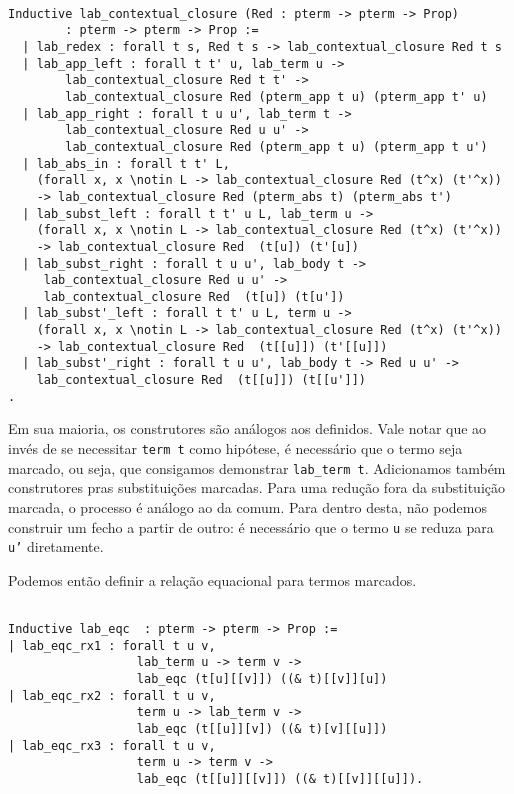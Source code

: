 \begin{lstlisting}[basicstyle=\small]

Inductive lab_contextual_closure (Red : pterm -> pterm -> Prop) 
        : pterm -> pterm -> Prop :=
  | lab_redex : forall t s, Red t s -> lab_contextual_closure Red t s
  | lab_app_left : forall t t' u, lab_term u -> 
        lab_contextual_closure Red t t' -> 
        lab_contextual_closure Red (pterm_app t u) (pterm_app t' u)
  | lab_app_right : forall t u u', lab_term t -> 
        lab_contextual_closure Red u u' -> 
        lab_contextual_closure Red (pterm_app t u) (pterm_app t u')
  | lab_abs_in : forall t t' L, 
    (forall x, x \notin L -> lab_contextual_closure Red (t^x) (t'^x)) 
    -> lab_contextual_closure Red (pterm_abs t) (pterm_abs t')
  | lab_subst_left : forall t t' u L, lab_term u -> 
    (forall x, x \notin L -> lab_contextual_closure Red (t^x) (t'^x)) 
    -> lab_contextual_closure Red  (t[u]) (t'[u])
  | lab_subst_right : forall t u u', lab_body t -> 
     lab_contextual_closure Red u u' -> 
	 lab_contextual_closure Red  (t[u]) (t[u']) 
  | lab_subst'_left : forall t t' u L, term u -> 
    (forall x, x \notin L -> lab_contextual_closure Red (t^x) (t'^x)) 
    -> lab_contextual_closure Red  (t[[u]]) (t'[[u]])
  | lab_subst'_right : forall t u u', lab_body t -> Red u u' -> 
    lab_contextual_closure Red  (t[[u]]) (t[[u']]) 
.
\end{lstlisting}

Em sua maioria, os construtores são análogos aos definidos. Vale notar que ao
invés de se necessitar \texttt{term t} como hipótese, é necessário que o termo
seja marcado, ou seja, que consigamos demonstrar \texttt{lab\_term t}.
Adicionamos também construtores pras substituições marcadas. 
Para uma redução fora da substituição marcada, o processo é análogo ao da comum.
Para dentro desta, não podemos construir um fecho a partir de outro: é
necessário que o termo \texttt{u} se reduza para \texttt{u'} diretamente.

Podemos então definir a relação equacional para termos marcados.

\begin{lstlisting}[basicstyle=\small]
    
Inductive lab_eqc  : pterm -> pterm -> Prop := 
| lab_eqc_rx1 : forall t u v, 
                  lab_term u -> term v -> 
                  lab_eqc (t[u][[v]]) ((& t)[[v]][u]) 
| lab_eqc_rx2 : forall t u v, 
                  term u -> lab_term v -> 
                  lab_eqc (t[[u]][v]) ((& t)[v][[u]]) 
| lab_eqc_rx3 : forall t u v, 
                  term u -> term v -> 
                  lab_eqc (t[[u]][[v]]) ((& t)[[v]][[u]]).
\end{lstlisting}

